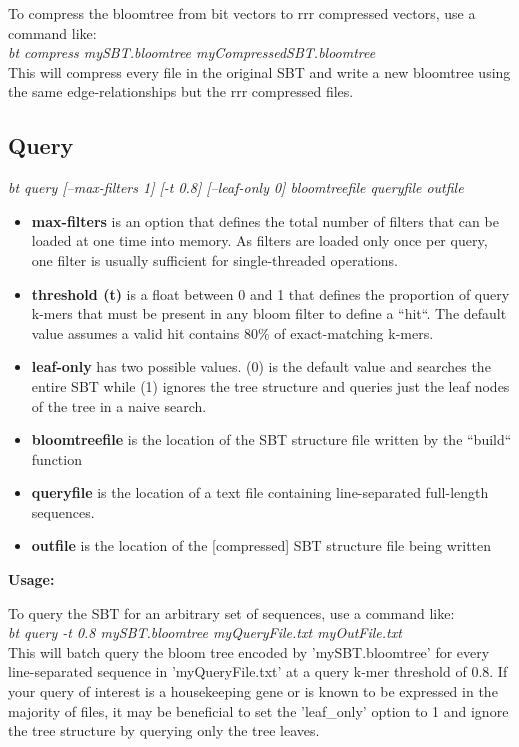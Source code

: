 \documentclass{article}
\begin{document}
To compress the bloomtree from bit vectors to rrr compressed vectors, use a command like: \\

\textit{bt compress mySBT.bloomtree myCompressedSBT.bloomtree} \\

This will compress every file in the original SBT and write a new bloomtree using the same edge-relationships but the rrr compressed files.


\subsection{Query}
\textit{bt query [--max-filters 1] [-t 0.8] [--leaf-only 0] bloomtreefile queryfile outfile}
\begin{itemize}
\item \textbf{max-filters} is an option that defines the total number of filters that can be loaded at one time into memory. As filters are loaded only once per query, one filter is usually sufficient for single-threaded operations.
\item \textbf{threshold (t)} is a float between 0 and 1 that defines the proportion of query k-mers that must be present in any bloom filter to define a ``hit``. The default value assumes a valid hit contains 80\% of exact-matching k-mers.
\item \textbf{leaf-only} has two possible values. (0) is the default value and searches the entire SBT while (1) ignores the tree structure and queries just the leaf nodes of the tree in a naive search.
\item \textbf{bloomtreefile} is the location of the SBT structure file written by the ``build`` function
\item \textbf{queryfile} is the location of a text file containing line-separated full-length sequences.
\item \textbf{outfile} is the location of the [compressed] SBT structure file being written
\end{itemize}
\textbf{Usage:}

To query the SBT for an arbitrary set of sequences, use a command like: \\

\textit{bt query -t 0.8 mySBT.bloomtree myQueryFile.txt myOutFile.txt} \\

This will batch query the bloom tree encoded by 'mySBT.bloomtree' for every line-separated sequence in 'myQueryFile.txt' at a query k-mer threshold of 0.8. If your query of interest is a housekeeping gene or is known to be expressed in the majority of files, it may be beneficial to set the 'leaf\_only' option to 1 and ignore the tree structure by querying only the tree leaves. 
\end{document}
